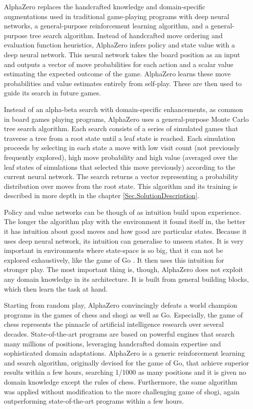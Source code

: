 AlphaZero \cite{Algo.AlphaZero} replaces the handcrafted knowledge and domain-specific augmentations used in traditional game-playing programs with deep neural networks, a general-purpose reinforcement learning algorithm, and a general-purpose tree search algorithm. Instead of handcrafted move ordering and evaluation function heuristics, AlphaZero infers policy and state value with a deep neural network. This neural network takes the board position as an input and outputs a vector of move probabilities for each action and a scalar value estimating the expected outcome of the game. AlphaZero learns these move probabilities and value estimates entirely from self-play. These are then used to guide its search in future games.

Instead of an alpha-beta search with domain-specific enhancements, as common in board games playing programs, AlphaZero uses a general-purpose Monte Carlo tree search \cite{Algo.MCTS} algorithm. Each search consists of a series of simulated games that traverse a tree from a root state until a leaf state is reached. Each simulation proceeds by selecting in each state a move with low visit count (not previously frequently explored), high move probability and high value (averaged over the leaf states of simulations that selected this move previously) according to the current neural network. The search returns a vector representing a probability distribution over moves from the root state. This algorithm and its training is described in more depth in the chapter \ref{Sec.SolutionDescription}.

Policy and value networks can be though of as intuition build upon experience. The longer the algorithm play with the environment it found itself in, the better it has intuition about good moves and how good are particular states. Because it uses deep neural network, its intuition can generalise to unseen states. It is very important in environments where state-space is so big, that it can not be explored exhaustively, like the game of Go \cite{Algo.AlphaGoZero}. It then uses this intuition for stronger play. The most important thing is, though, AlphaZero does not exploit any domain knowledge in its architecture. It is built from general building blocks, which then learn the task at hand.

Starting from random play, AlphaZero convincingly defeats a world champion programs in the games of chess and shogi as well as Go. Especially, the game of chess represents the pinnacle of artificial intelligence research over several decades. State-of-the-art programs are based on powerful engines that search many millions of positions, leveraging handcrafted domain expertise and sophisticated domain adaptations. AlphaZero is a generic reinforcement learning and search algorithm, originally devised for the game of Go, that achieve superior results within a few hours, searching 1/1000 as many positions and it is given no domain knowledge except the rules of chess. Furthermore, the same algorithm was applied without modification to the more challenging game of shogi, again outperforming state-of-the-art programs within a few hours.

